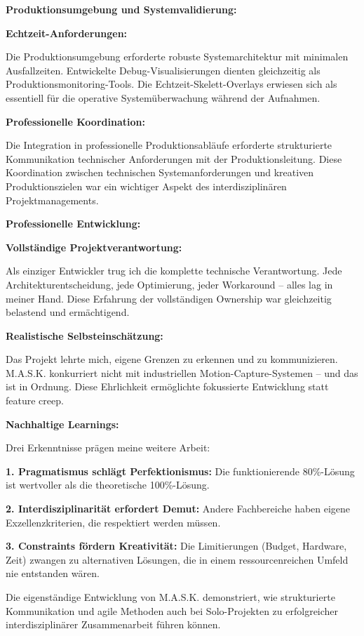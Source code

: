 \textbf{Produktionsumgebung und Systemvalidierung:}

\textbf{Echtzeit-Anforderungen:}

Die Produktionsumgebung erforderte robuste Systemarchitektur mit minimalen Ausfallzeiten. Entwickelte Debug-Visualisierungen dienten gleichzeitig als Produktionsmonitoring-Tools. Die Echtzeit-Skelett-Overlays erwiesen sich als essentiell für die operative Systemüberwachung während der Aufnahmen.

\textbf{Professionelle Koordination:}

Die Integration in professionelle Produktionsabläufe erforderte strukturierte Kommunikation technischer Anforderungen mit der Produktionsleitung. Diese Koordination zwischen technischen Systemanforderungen und kreativen Produktionszielen war ein wichtiger Aspekt des interdisziplinären Projektmanagements.

\textbf{Professionelle Entwicklung:}

\textbf{Vollständige Projektverantwortung:}

Als einziger Entwickler trug ich die komplette technische Verantwortung. Jede Architekturentscheidung, jede Optimierung, jeder Workaround – alles lag in meiner Hand. Diese Erfahrung der vollständigen Ownership war gleichzeitig belastend und ermächtigend.

\textbf{Realistische Selbsteinschätzung:}

Das Projekt lehrte mich, eigene Grenzen zu erkennen und zu kommunizieren. M.A.S.K. konkurriert nicht mit industriellen Motion-Capture-Systemen – und das ist in Ordnung. Diese Ehrlichkeit ermöglichte fokussierte Entwicklung statt feature creep.

\textbf{Nachhaltige Learnings:}

Drei Erkenntnisse prägen meine weitere Arbeit:

\textbf{1. Pragmatismus schlägt Perfektionismus:} Die funktionierende 80\%-Lösung ist wertvoller als die theoretische 100\%-Lösung.

\textbf{2. Interdisziplinarität erfordert Demut:} Andere Fachbereiche haben eigene Exzellenzkriterien, die respektiert werden müssen.

\textbf{3. Constraints fördern Kreativität:} Die Limitierungen (Budget, Hardware, Zeit) zwangen zu alternativen Lösungen, die in einem ressourcenreichen Umfeld nie entstanden wären.

Die eigenständige Entwicklung von M.A.S.K. demonstriert, wie strukturierte Kommunikation und agile Methoden auch bei Solo-Projekten zu erfolgreicher interdisziplinärer Zusammenarbeit führen können.
